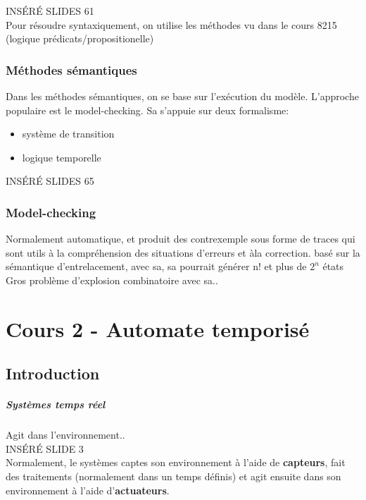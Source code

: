 \documentclass[oneside]{book}
\begin{document}
    INSÉRÉ SLIDES 61\\
    
    Pour résoudre syntaxiquement, on utilise les méthodes vu dans le cours 8215 (logique prédicats/propositionelle)\\
    
    \subsection{Méthodes sémantiques}
    Dans les méthodes sémantiques, on se base sur l'exécution du modèle. L'approche populaire est le model-checking. Sa s'appuie sur deux formalisme:
    \begin{itemize}
        \item système de transition
        \item logique temporelle
    \end{itemize}

    INSÉRÉ SLIDES 65\\
    
    \subsection{Model-checking}
    Normalement automatique, et produit des contrexemple sous forme de traces qui sont utils à la compréhension des situations d'erreurs et àla correction. basé sur la sémantique d'entrelacement, avec sa, sa pourrait générer n! et plus de $2^{n}$ états\\
    
    Gros problème d'explosion combinatoire avec sa..\\
    
    \chapter{Cours 2 - Automate temporisé}
    \section{Introduction}
    \paragraph{Systèmes temps réel} Agit dans l'environnement.. \\
    INSÉRÉ SLIDE 3\\
    
    Normalement, le systèmes captes son environnement à l'aide de \textbf{capteurs}, fait des traitements (normalement dans un temps définis) et agit ensuite dans son environnement à l'aide d'\textbf{actuateurs}.\\
    
\end{document}
